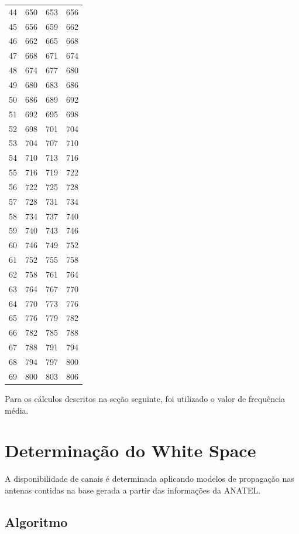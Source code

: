 \begin{center}
\begin{longtable}{cccc}
44 & 650 & 653 & 656 \\ 
45 & 656 & 659 & 662 \\ 
46 & 662 & 665 & 668 \\ 
47 & 668 & 671 & 674 \\ 
48 & 674 & 677 & 680 \\ 
49 & 680 & 683 & 686 \\ 
50 & 686 & 689 & 692 \\ 
51 & 692 & 695 & 698 \\ 
52 & 698 & 701 & 704 \\ 
53 & 704 & 707 & 710 \\ 
54 & 710 & 713 & 716 \\ 
55 & 716 & 719 & 722 \\ 
56 & 722 & 725 & 728 \\ 
57 & 728 & 731 & 734 \\ 
58 & 734 & 737 & 740 \\ 
59 & 740 & 743 & 746 \\ 
60 & 746 & 749 & 752 \\ 
61 & 752 & 755 & 758 \\ 
62 & 758 & 761 & 764 \\ 
63 & 764 & 767 & 770 \\ 
64 & 770 & 773 & 776 \\ 
65 & 776 & 779 & 782 \\ 
66 & 782 & 785 & 788 \\ 
67 & 788 & 791 & 794 \\ 
68 & 794 & 797 & 800 \\ 
69 & 800 & 803 & 806 \\ 

\end{longtable}
\end{center}


Para os cálculos descritos na seção seguinte, foi utilizado o valor de frequência média.

\section{Determinação do White Space}

A disponibilidade de canais é determinada aplicando modelos de propagação nas antenas contidas na base gerada a partir das informações da ANATEL. 

\subsection{Algoritmo}

